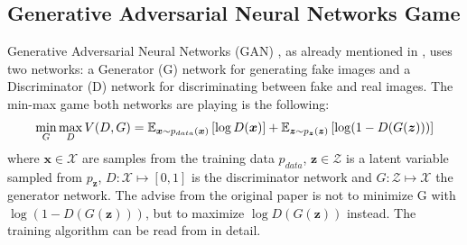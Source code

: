 
\subsection{Generative Adversarial Neural Networks Game}\label{sec:nn_theory_gan}
\thesisStateNew
Generative Adversarial Neural Networks (GAN) \cite{Goodfellow2014}, as already mentioned in , uses two networks: a Generator (G) network for generating fake images and a Discriminator (D) network for discriminating between fake and real images.
The min-max game both networks are playing is the following:
\begin{equation}\label{eq:nn_theory_gan}
  \underset{G}{\min} \, \underset{D}{\max} \, V(D, G) = \mathbb{E}_{\bm{x} \sim p_{data}(\bm{x})}\left[ \log D(\bm{x}) \right] + 
    \mathbb{E}_{\bm{z} \sim p_{\bm{z}}(\bm{z})}\left[ \log (1 - D(G(\bm{z}))) \right]
\end{equation}
where $\bm{x} \in \mathcal{X}$ are samples from the training data $p_{data}$, $\bm{z} \in \mathcal{Z}$ is a latent variable sampled from $p_{\bm{z}}$, $D: \mathcal{X} \mapsto [0, 1]$ is the discriminator network and $G: \mathcal{Z} \mapsto \mathcal{X}$ the generator network.
The advise from the original paper is not to minimize G with $\log (1 - D(G(\bm{z})))$, but to maximize $\log D(G(\bm{z}))$ instead.
The training algorithm can be read from \cite{Goodfellow2014} in detail.